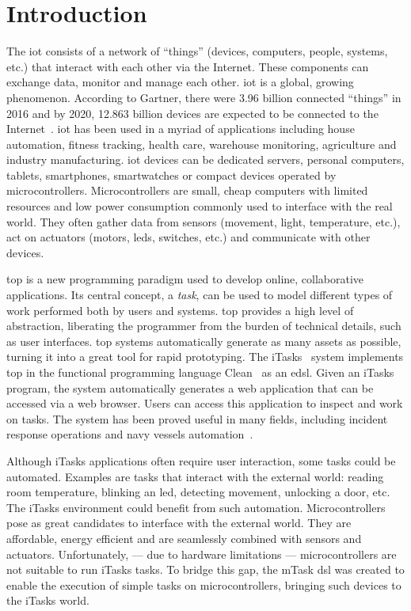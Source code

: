\section{Introduction}
The \ac{iot} consists of a network of ``things'' (devices, computers, people, systems, etc.) that interact with each other via the Internet. These components can exchange data, monitor and manage each other. \ac{iot} is a global, growing phenomenon. According to Gartner, there were 3.96 billion connected ``things'' in 2016 and by 2020, 12.863 billion devices are expected to be connected to the Internet~\cite{iot_numbers}. \ac{iot} has been used in a myriad of applications including house automation, fitness tracking, health care, warehouse monitoring, agriculture and industry manufacturing. \ac{iot} devices can be dedicated servers, personal computers, tablets, smartphones, smartwatches or compact devices operated by microcontrollers. Microcontrollers are small, cheap computers with limited resources and low power consumption commonly used to interface with the real world. They often gather data from sensors (movement, light, temperature, etc.), act on actuators (motors, \acsp{led}, switches, etc.) and communicate with other devices.

\ac{top} is a new programming paradigm used to develop online, collaborative applications. Its central concept, a \textit{task}, can be used to model different types of work performed both by users and systems. \ac{top} provides a high level of abstraction, liberating the programmer from the burden of technical details, such as user interfaces. \ac{top} systems automatically generate as many assets as possible, turning it into a great tool for rapid prototyping. The iTasks~\cite{top} system implements \ac{top} in the functional programming language Clean~\cite{clean} as an \ac{edsl}. Given an iTasks program, the system automatically generates a web application that can be accessed via a web browser. Users can access this application to inspect and work on tasks. The system has been proved useful in many fields, including incident response operations and navy vessels automation~\cite{incidone,navy}.

Although iTasks applications often require user interaction, some tasks could be automated. Examples are tasks that interact with the external world: reading room temperature, blinking an \acs{led}, detecting movement, unlocking a door,  etc. The iTasks environment could benefit from such automation. Microcontrollers pose as great candidates to interface with the external world. They are affordable, energy efficient and are seamlessly combined with sensors and actuators. Unfortunately, --- due to hardware limitations --- microcontrollers are not suitable to run iTasks tasks. To bridge this gap, the mTask \ac{dsl} was created to enable the execution of simple tasks on microcontrollers, bringing such devices to the iTasks world.


